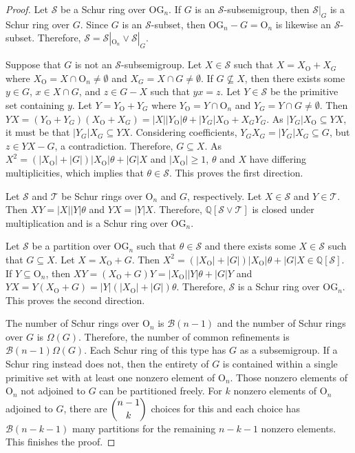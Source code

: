\documentclass{article}
\theoremstyle{plain}
\theoremstyle{definition}
\renewcommand{\S}{\mathcal{S}}
\newcommand{\T}{\mathcal{T}}
\newcommand{\Q}{\mathbb{Q}}
\newcommand{\QS}{\Q[\S]}
\newcommand{\B}{\mathscr{B}}
\renewcommand{\O}{\mathrm{O}}
\newcommand{\OG}{\mathrm{OG}}
\begin{document}
\begin{proof}
    Let $\S$ be a Schur ring over $\OG_n$. If $G$ is an $\S$-subsemigroup, then $\S|_{G}$ is a Schur ring over $G$. Since $G$ is an $\S$-subset, then $\OG_n-G = \O_n$ is likewise an $\S$-subset. Therefore, $\S = \S|_{\O_n}\vee \S|_{G}$. 

    Suppose that $G$ is not an $\S$-subsemigroup. Let $X\in \S$ such that $X = X_\O+X_G$ where $X_\O = X\cap \O_n \neq \emptyset$ and $X_G = X\cap G\neq \emptyset$. If $G \not\subseteq X$, then there exists some $y\in G$, $x\in X\cap G$, and $z\in G-X$ such that $yx=z$. Let $Y\in \S$ be the primitive set containing $y$. Let $Y = Y_\O+Y_G$ where $Y_\O = Y\cap \O_n$ and $Y_G = Y\cap G\neq \emptyset$. Then $YX = (Y_\O+Y_G)(X_\O+X_G) = |X||Y_\O|\theta + |Y_G|X_\O + X_GY_G$. As $|Y_G|X_\O\subseteq YX$, it must be that $|Y_G|X_G\subseteq YX$. Considering coefficients, $Y_GX_G=|Y_G|X_G \subseteq G$, but $z\in YX-G$, a contradiction. Therefore, $G\subseteq X$. As $X^2 = (|X_\O|+|G|)|X_\O|\theta + |G|X$ and $|X_\O|\ge 1$, $\theta$ and $X$ have differing multiplicities, which implies that $\theta\in\S$. This proves the first direction.

    Let $\S$ and $\T$ be Schur rings over $\O_n$ and $G$, respectively. Let $X\in \S$ and $Y\in \T$. Then $XY = |X||Y|\theta$ and $YX = |Y|X$. Therefore, $\Q[\S\vee \T]$ is closed under multiplication and is a Schur ring over $\OG_n$. 

    Let $\S$ be a partition over $\OG_n$ such that $\theta \in \S$ and there exists some $X\in \S$ such that $G\subseteq X$. Let $X = X_\O + G$. %
    Then $X^2 = (|X_\O|+|G|)|X_\O|\theta + |G|X\in \QS$. If $Y\subseteq \O_n$, then $XY = (X_\O+G)Y = |X_\O||Y|\theta + |G|Y$ and $YX = Y(X_\O+G) = |Y|(|X_\O|+|G|)\theta$. Therefore, $\S$ is a Schur ring over $\OG_n$. This proves the second direction.

    The number of Schur rings over $\O_n$ is $\B(n-1)$ and the number of Schur rings over $G$ is $\Omega(G)$. Therefore, the number of common refinements is $\B(n-1)\Omega(G)$. Each Schur ring of this type has $G$ as a subsemigroup. If a Schur ring instead does not, then the entirety of $G$ is contained within a single primitive set with at least one nonzero element of $\O_n$. Those nonzero elements of $\O_n$ not adjoined to $G$ can be partitioned freely. For $k$ nonzero elements of $\O_n$ adjoined to $G$, there are $\dbinom{n-1}{k}$ choices for this and each choice has $\B(n-k-1)$ many partitions for the remaining $n-k-1$ nonzero elements. This finishes the proof.
\end{proof}
\end{document}
